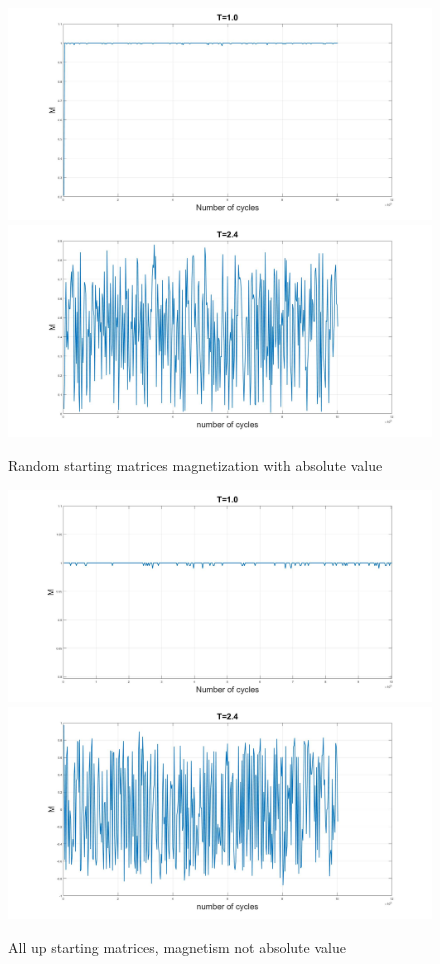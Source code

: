 \documentclass[10pt,a4paper]{article}
\begin{document}
\begin{figure}
\centerline{
\includegraphics[scale=0.15]{RANDOMmag1abs.jpg}
\includegraphics[scale=0.15]{RANDOMmag24abs.jpg}
}
\caption{Random starting matrices magnetization with absolute value }
\label{fig:RandomMagAbs}
\end{figure}

\begin{figure} [H]
\centerline{
\includegraphics[scale=0.15]{UPmag1notabs.jpg}
\includegraphics[scale=0.15]{UPmag24notabs.jpg}
}
\caption{All up starting matrices, magnetism not absolute value}
\label{fig:UpMagNotAbs}
\end{figure}
\end{document}
